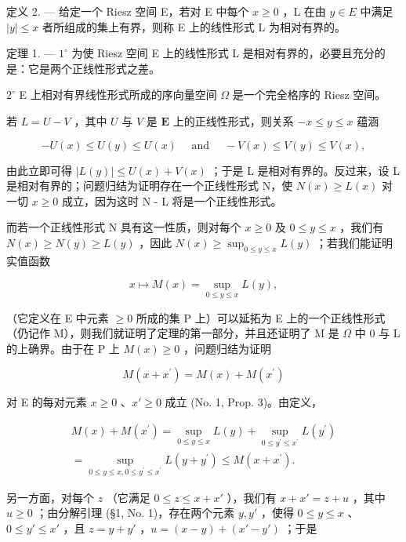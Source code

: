 定义 2. --- 给定一个 Riesz 空间 E，若对 E 中每个 \(x \geqslant 0\) ，L 在由 \(y \in E\) 中满足 \(|y| \leqslant x\) 者所组成的集上有界，则称 E 上的线性形式 L 为相对有界的。

定理 1. --- \(1^{\circ}\) 为使 Riesz 空间 E 上的线性形式 L 是相对有界的，必要且充分的是：它是两个正线性形式之差。

\(2^{\circ}\) E 上相对有界线性形式所成的序向量空间 \(\Omega\) 是一个完全格序的 Riesz 空间。

若 \(L = U - V\) ，其中 \(U\) 与 \(V\) 是 \(\mathbf{E}\) 上的正线性形式，则关系 \(-x \leqslant y \leqslant x\) 蕴涵

\[
- U (x) \leqslant U (y) \leqslant U (x) \quad \text { and } \quad - V (x) \leqslant V (y) \leqslant V (x),
\]

由此立即可得 \(|L(y)| \leqslant U(x) + V(x)\) ；于是 L 是相对有界的。反过来，设 L 是相对有界的；问题归结为证明存在一个正线性形式 N，使 \(N(x) \geqslant L(x)\) 对一切 \(x \geqslant 0\) 成立，因为这时 N - L 将是一个正线性形式。

而若一个正线性形式 N 具有这一性质，则对每个 \(x \geqslant 0\) 及 \(0 \leqslant y \leqslant x\) ，我们有 \(N(x) \geqslant N(y) \geqslant L(y)\) ，因此 \(N(x) \geqslant \sup_{0 \leqslant y \leqslant x} L(y)\) ；若我们能证明实值函数

\[
x \mapsto M (x) = \sup _ {0 \leqslant y \leqslant x} L (y),
\]

（它定义在 E 中元素 \(\geqslant0\) 所成的集 P 上）可以延拓为 E 上的一个正线性形式（仍记作 M），则我们就证明了定理的第一部分，并且还证明了 M 是 \(\Omega\) 中 0 与 L 的上确界。由于在 P 上 \(M(x)\geqslant0\) ，问题归结为证明

\[
M (x + x ^ {\prime}) = M (x) + M (x ^ {\prime})
\]

对 E 的每对元素 \(x \geqslant 0\) 、\(x' \geqslant 0\) 成立 (No. 1, Prop. 3)。由定义，

\[
\begin{array}{c} M (x) + M (x ^ {\prime}) = \sup _ {0 \leqslant y \leqslant x} L (y) + \sup _ {0 \leqslant y ^ {\prime} \leqslant x ^ {\prime}} L (y ^ {\prime}) \\ = \sup _ {0 \leqslant y \leqslant x, 0 \leqslant y ^ {\prime} \leqslant x ^ {\prime}} L (y + y ^ {\prime}) \leqslant M (x + x ^ {\prime}). \end{array}
\]

另一方面，对每个 \(z\) （它满足 \(0 \leqslant z \leqslant x + x'\) ），我们有 \(x + x' = z + u\) ，其中 \(u \geqslant 0\) ；由分解引理 (§1, No. 1)，存在两个元素 \(y, y'\) ，使得 \(0 \leqslant y \leqslant x\) 、\(0 \leqslant y' \leqslant x'\) ，且 \(z = y + y'\) ，\(u = (x - y) + (x' - y')\) ；于是

